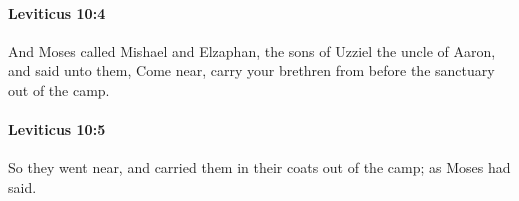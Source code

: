 		\paragraph{Leviticus 10:4} %
			\label{LEVITICUS-10-4}

			And Moses called Mishael and Elzaphan, the sons of Uzziel the uncle of Aaron, and said unto them, Come near, carry your brethren from before the sanctuary out of the camp.


		\paragraph{Leviticus 10:5} %
			\label{LEVITICUS-10-5}

			So they went near, and carried them in their coats out of the camp; as Moses had said.


